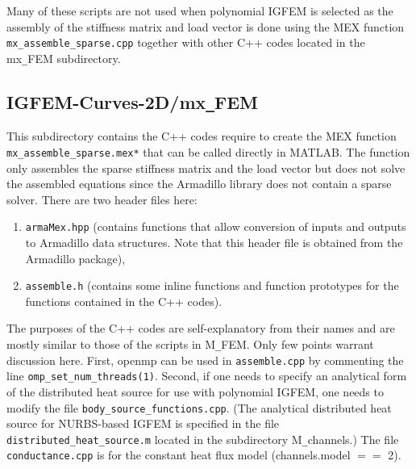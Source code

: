 \documentclass[11pt,letterpaper]{article}
\begin{document}
Many of these scripts are not used when polynomial IGFEM is selected as the assembly of the stiffness matrix and load vector is done using the MEX function \texttt{mx\_assemble\_sparse.cpp} together with other C++ codes located in the mx\texttt{\_}FEM subdirectory. 
 
\subsection{IGFEM-Curves-2D/mx\texttt{\_}FEM}
This subdirectory contains the C++ codes require to create the MEX function \texttt{mx\_assemble\_sparse.mex*} that can be called directly in MATLAB. The function only assembles the sparse stiffness matrix and the load vector but does not solve the assembled equations since the Armadillo library does not contain a sparse solver. There are two header files here: 
\begin{enumerate}
\item \texttt{armaMex.hpp} (contains functions that allow conversion of inputs and outputs to Armadillo data structures. Note that this header file is obtained from the Armadillo package),
\item \texttt{assemble.h} (contains some inline functions and function prototypes for the functions contained in the C++ codes). 
\end{enumerate}
The purposes of the C++ codes are self-explanatory from their names and are mostly similar to those of the scripts in M\texttt{\_}FEM. Only few points warrant discussion here. First, openmp can be used in \texttt{assemble.cpp} by commenting the line \texttt{omp\_set\_num\_threads(1)}.  Second, if one needs to specify an analytical form of the distributed heat source for use with polynomial IGFEM, one needs to modify the file \texttt{body\_source\_functions.cpp}. (The analytical distributed heat source for NURBS-based IGFEM is specified in the file \texttt{distributed\_heat\_source.m} located in the subdirectory M\texttt{\_}channels.) The file \texttt{conductance.cpp} is for the constant heat flux model (channels.model $==$ 2). 
\end{document}
